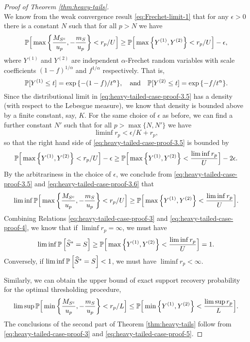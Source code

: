 \begin{proof}[Proof of Theorem \ref{thm:heavy-tails}]
\begin{equation}
\end{equation}
We know from the weak convergence result \eqref{eq:Frechet-limit-1} that for any $\epsilon>0$ there is a constant $N$ such that for all $p>N$ we have 
\begin{equation} \label{eq:heavy-tailed-case-proof-3.5}
    \P\Big[\max\left\{\frac{M_{S^c}}{u_p}, -\frac{m_S}{u_p}\right\} < r_p/U\Big]
    \ge \P\Big[\max\left\{Y^{(1)}, Y^{(2)}\right\} < {r_p}/{U}\Big] - \epsilon,
\end{equation}
where $Y^{(1)}$ and $Y^{(2)}$ are independent $\alpha$-Frechet random variables with scale coefficients $(1-f)^{1/\alpha}$ and $f^{1/\alpha}$ respectively.
That is,
\begin{equation*}
    \P[Y^{(1)}\le t] = \exp{\{-(1-f)/t^\alpha\}}, 
    \quad \text{and} \quad
    \P[Y^{(2)}\le t] = \exp{\{-f/t^\alpha\}}.
\end{equation*}
Since the distributional limit in \eqref{eq:heavy-tailed-case-proof-3.5} has a density (with respect to the Lebesgue measure), we know that density is bounded above by a finite constant, say, $K$.
For the same choice of $\epsilon$ as before, we can find a further constant $N'$ such that for all $p>\max\{N, N'\}$ we have 
$$
    \liminf r_p < \epsilon/K + r_p,
$$
so that the right hand side of \eqref{eq:heavy-tailed-case-proof-3.5} is bounded by
\begin{equation} \label{eq:heavy-tailed-case-proof-3.6}
    \P\Big[\max\left\{Y^{(1)}, Y^{(2)}\right\} < {r_p}/{U}\Big] - \epsilon
    \ge \P\Big[\max\left\{Y^{(1)}, Y^{(2)}\right\} < \frac{\liminf r_p}{U}\Big] - 2\epsilon.
\end{equation}
By the arbitrariness in the choice of $\epsilon$, we conclude from \eqref{eq:heavy-tailed-case-proof-3.5} and \eqref{eq:heavy-tailed-case-proof-3.6} that
\begin{equation} \label{eq:heavy-tailed-case-proof-4}
    \liminf \P\Big[\max\left\{\frac{M_{S^c}}{u_p}, -\frac{m_S}{u_p}\right\} < r_p/U\Big]
    \ge \P\Big[\max\left\{Y^{(1)}, Y^{(2)}\right\} < \frac{\liminf r_p}{U}\Big].
\end{equation}
Combining Relations \eqref{eq:heavy-tailed-case-proof-3} and \eqref{eq:heavy-tailed-case-proof-4}, we know that if $\liminf r_p = \infty$, we must have 
$$
    \liminf\P\left[\widehat{S}^*=S\right]
    \ge \P\Big[\max\left\{Y^{(1)}, Y^{(2)}\right\} < \frac{\liminf r_p}{U}\Big] = 1.
$$
Conversely, if $\liminf\P\left[\widehat{S}^*=S\right]<1$, we must have $\liminf r_p < \infty$.

Similarly, we can obtain the upper bound of exact support recovery probability for the optimal thresholding procedure,
\begin{equation} \label{eq:heavy-tailed-case-proof-5}
    \limsup \P\Big[\min\left\{\frac{M_{S^c}}{u_p}, -\frac{m_S}{u_p}\right\} < r_p/L\Big]
    \le \P\Big[\min\left\{Y^{(1)}, Y^{(2)}\right\} < \frac{\limsup r_p}{L}\Big].
\end{equation}
The conclusions of the second part of Theorem \ref{thm:heavy-tails} follow from \eqref{eq:heavy-tailed-case-proof-3} and \eqref{eq:heavy-tailed-case-proof-5}.
\end{proof}

